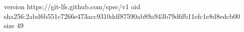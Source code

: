 version https://git-lfs.github.com/spec/v1
oid sha256:2abd6b551c7266e473acc9310ddf87590ab89a943b79d6fb11efc1e8d8edcb00
size 49
